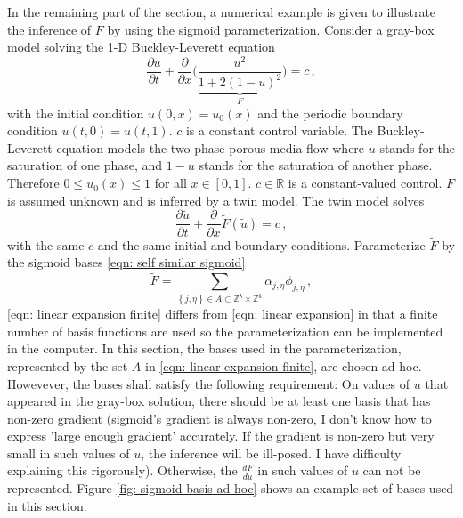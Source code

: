 In the remaining part of the section, a numerical example is given to illustrate the inference
of $F$ by using the sigmoid parameterization.
Consider a gray-box model solving the 1-D Buckley-Leverett equation
\cite{Buckley Leverett}
\begin{equation}
    \frac{\partial u}{\partial t} + \frac{\partial}{\partial x}\Big(\underbrace{
    \frac{u^2}{1+ 2(1-u)^2}}_{F} \Big) = c\,,
    \label{eqn: Buckley-Leverett}
\end{equation}
with the initial condition $u(0,x)=u_0(x)$ and the periodic boundary condition $u(t,0)=u(t,1)$. 
$c$ is a constant control variable.
The Buckley-Leverett equation models the two-phase porous media flow where $u$ stands for the
saturation of one phase, and $1-u$ stands for the saturation of another phase. 
Therefore $0 \le u_0(x) \le 1$ for all $x\in [0,1]$. 
$c\in \mathbb{R}$ is a constant-valued control. $F$ is assumed unknown and is inferred by a twin model.
The twin model solves 
\begin{equation}
    \frac{\partial \tilde{u}}{\partial t} + \frac{\partial}{\partial x}\tilde{F}(\tilde{u})
    = c\,,
    \label{eqn: Buckley-Leverett twin}
\end{equation}
with the same $c$ and the same initial and boundary conditions. Parameterize $\tilde{F}$ by
the sigmoid bases \eqref{eqn: self similar sigmoid}
\begin{equation}
    \tilde{F} = \sum_{{\left\{j, \eta\right\}}\in A\subset \mathbb{Z}^k\times \mathbb{Z}^k} 
                       \alpha_{{j}, {\eta}}
                       \phi_{{j}, {\eta}}\,,
    \label{eqn: linear expansion finite}
\end{equation}
\eqref{eqn: linear expansion finite} differs from 
\eqref{eqn: linear expansion} in that a finite number of basis functions are used so
the parameterization can be implemented in the computer. In this section, the bases used
in the parameterization, represented by the set $A$ in \eqref{eqn: linear expansion finite},
are chosen ad hoc. Howevever, the bases shall satisfy the following requirement:
On values of $u$ that appeared in the gray-box solution, 
there should be at least one basis that has non-zero gradient (sigmoid's gradient 
is always non-zero, I don't know how to express 'large enough gradient' accurately. If
the gradient is non-zero but very small in such values of $u$, the inference will be ill-posed.
I have difficulty explaining this rigorously).
Otherwise, the $\frac{dF}{du}$ in such values of $u$ can not be represented.
Figure \ref{fig: sigmoid basis ad hoc} shows an example set of bases used in this section.
